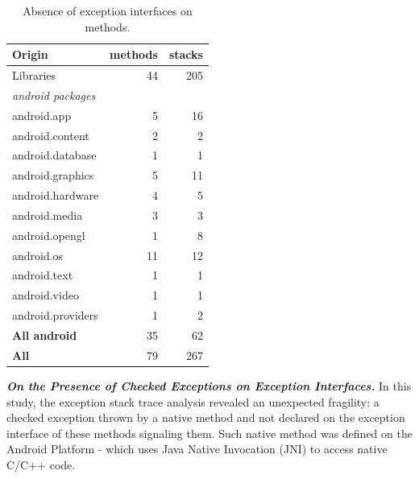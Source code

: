 \documentclass[conference]{IEEEtran}
\begin{document}
\noindent {}

\begin{table}
\centering

\begin{tabular}{lrr}
    \hline
 \bfseries{Origin}   & \bfseries{methods} &  \bfseries{stacks}  \\ 
\hline					
Libraries	& 	44	& 	205	\\					
\emph{android packages}   &  &   \\ 
android.app	& 	5	& 	16	\\
android.content	& 	2	& 	2	\\
android.database	& 	1	& 	1	\\
android.graphics	& 	5	& 	11	\\
android.hardware	& 	4	& 	5	\\
android.media	& 	3	& 	3	\\
android.opengl	& 	1	& 	8	\\
android.os	& 	11	& 	12	\\
android.text	& 	1	& 	1	\\
android.video	& 	1	& 	1	\\
android.providers	& 	1	& 	2	\\
\hline					
\bfseries{All android} 	&	35	&	62	\\
\hline					
\bfseries{All}	&	79	&	267	\\
\hline					
  \end{tabular}
\caption{Absence of exception interfaces on methods.}
\label{tab:runtimeinterface}
\end{table}


\emph{\textbf{On the Presence of Checked Exceptions on Exception Interfaces.}} 
In this study, the exception stack trace analysis revealed an unexpected fragility: a 
checked exception thrown by a native method and not declared on the exception 
interface of these methods signaling them. Such native method was defined on
 the Android Platform -  which uses Java Native Invocation (JNI) to access 
native C/C++ code. 
\end{document}
